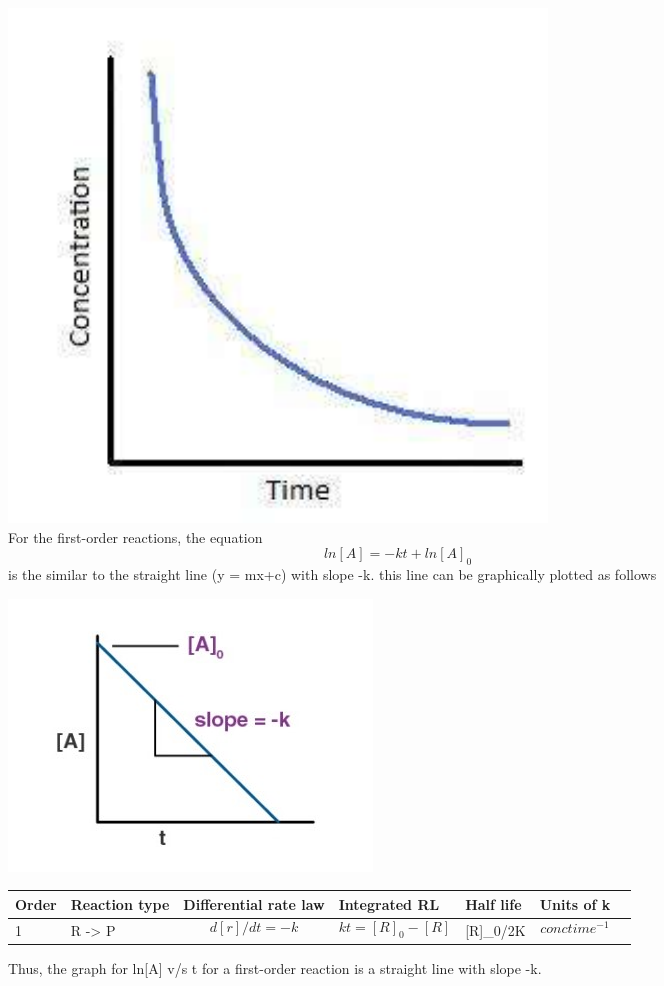 \begin{figure}[b]
    
    \includegraphics[scale=0.55]{jan-may-2022-latex/AE21B045/latexdash_compressed (1).pdf}
   \\
   For the first-order reactions, the equation $$ln[A]= -kt+ln[A]_0$$ is the similar to the straight line (y = mx+c) with slope -k. this line can be graphically plotted as follows
   \end{figure}
   

\begin{figure}[H]
   \includegraphics[scale=1]{jan-may-2022-latex/AE21B045/slopedited.jpeg}
   \caption{Thus, the graph for ln[A] v/s t for a first-order reaction is a straight line with slope -k.}
    \begin{tabular}{|l|l|l|l|l|l|l|}

\hline
Order & Reaction type & Differential rate law &Integrated RL& Half life & Units of k\\
\hline
    1 & R -> P & $$d[r]/dt = -k$$ & $$kt = [R]_0 - [R]$$ & [R]_0/2K& $$conc time^{-1}$$ \\
\hline
\end{tabular}
\end{figure}




